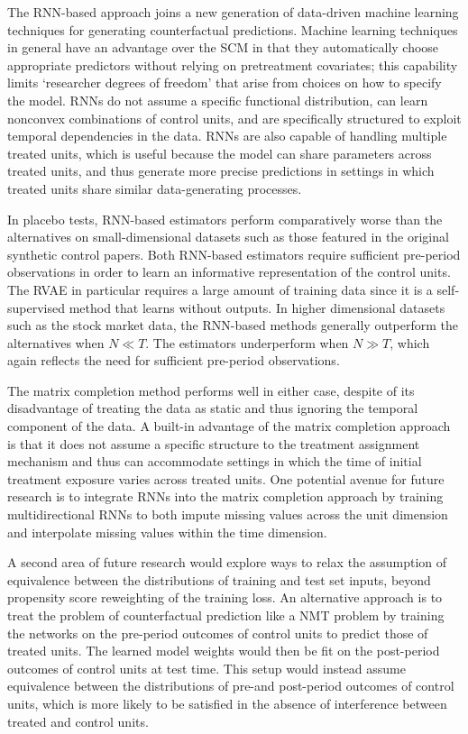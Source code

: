 The RNN-based approach joins a new generation of data-driven machine learning techniques for generating counterfactual predictions. Machine learning techniques in general have an advantage over the SCM in that they automatically choose appropriate predictors without relying on pretreatment covariates; this capability limits `researcher degrees of freedom' that arise from choices on how to specify the model. RNNs do not assume a specific functional distribution, can learn nonconvex combinations of control units, and are specifically structured to exploit temporal dependencies in the data. RNNs are also capable of handling multiple treated units, which is useful because the model can share parameters across treated units, and thus generate more precise predictions in settings in which treated units share similar data-generating processes. 

In placebo tests, RNN-based estimators perform comparatively worse than the alternatives on small-dimensional datasets such as those featured in the original synthetic control papers. Both RNN-based estimators require sufficient pre-period observations in order to learn an informative representation of the control units. The RVAE in particular requires a large amount of training data since it is a self-supervised method that learns without outputs. In higher dimensional datasets such as the stock market data, the RNN-based methods generally outperform the alternatives when  $N \ll T$. The estimators underperform when $N \gg T$, which again reflects the need for sufficient pre-period observations. 

The matrix completion method performs well in either case, despite of its disadvantage of treating the data as static and thus ignoring the temporal component of the data. A built-in advantage of the matrix completion approach is that it does not assume a specific structure to the treatment assignment mechanism and thus can accommodate settings in which the time of initial treatment exposure varies across treated units. One potential avenue for future research is to integrate RNNs into the matrix completion approach by training multidirectional RNNs \citep[e.g.,][]{yoon2018estimating} to both impute missing values across the unit dimension and interpolate missing values within the time dimension. 

A second area of future research would explore ways to relax the assumption of equivalence between the distributions of training and test set inputs, beyond propensity score reweighting of the training loss. An alternative approach is to treat the problem of counterfactual prediction like a NMT problem by training the networks on the pre-period outcomes of control units to predict those of treated units. The learned model weights would then be fit on the post-period outcomes of control units at test time. This setup would instead assume equivalence between the distributions of pre-and post-period outcomes of control units, which is more likely to be satisfied in the absence of interference between treated and control units. 

